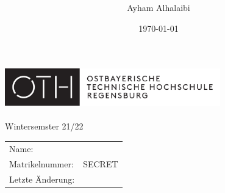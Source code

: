 \documentclass[10pt, journal]{IEEEtran}			%
\title{\FS \ \Fach}
\author{Ayham Alhalaibi}
\date{\today}
\def\MatNr{SECRET} %
\def\Semester{Wintersemster 21/22}
\begin{document}
\begin{titlepage}
	\thispagestyle{empty}

	\begin{center}
        \includegraphics[width=0.7\textwidth]{./OTHR_OTHR_Logo.pdf}\\
		\Huge
		\textsc{\MyTitle}\\
		\normalsize
		\Semester

		{\renewcommand{\arraystretch}{1.5}
			\begin{tabular}{l l}
				Name:            & \hspace{4cm}\MyAuthor \\
				Matrikelnummer:  & \hspace{4cm}\MatNr    \\
				Letzte Änderung: & \hspace{4cm}\MyDate
			\end{tabular}
		}

	\end{center}
\end{titlepage}


\newpage






\end{document}
